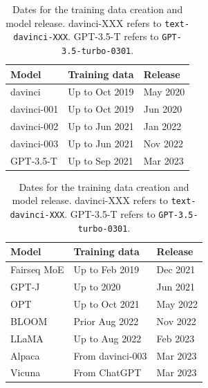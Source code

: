 \documentclass[letterpaper]{article} %
\begin{document}
\begin{table}[t!]
\centering 
\begin{subtable}{\columnwidth}
\centering 
\begin{tabular}{lll}
\toprule
Model            & Training data & Release   \\
\midrule
davinci          & Up to Oct 2019 & May 2020       \\
davinci-001 & Up to Oct 2019 & Jun 2020       \\
davinci-002 & Up to Jun 2021 & Jan 2022      \\
davinci-003 & Up to Jun 2021 & Nov 2022        \\
GPT-3.5-T    & Up to Sep 2021  & Mar 2023    \\
\bottomrule
\end{tabular}
\caption{GPT-3 Series LLMs}
\end{subtable}

\hspace{0.1cm}

\begin{subtable}{\columnwidth}
\centering 
\begin{tabular}{lll}
\toprule
Model            & Training data & Release   \\
\midrule
Fairseq MoE      & Up to Feb 2019 &  Dec 2021     \\
GPT-J            & Up to 2020 & Jun 2021           \\
OPT              & Up to Oct 2021 &  May 2022     \\
BLOOM            & Prior Aug 2022 &  Nov 2022     \\
LLaMA            & Up to Aug 2022  & Feb 2023    \\
Alpaca           & From davinci-003 & Mar 2023 \\
Vicuna           & From ChatGPT  & Mar 2023   \\
\bottomrule
\end{tabular}
\caption{Open LLMs}
\end{subtable}
\caption{Dates for the training data creation and model release. davinci-XXX refers to \texttt{text-davinci-XXX}. GPT-3.5-T refers to \texttt{GPT-3.5-turbo-0301}.}
\label{tab:data-time}
\end{table}
\end{document}
